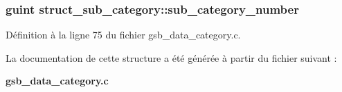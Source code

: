 \subsubsection[{sub\_\-category\_\-number}]{\setlength{\rightskip}{0pt plus 5cm}guint {\bf struct\_\-sub\_\-category::sub\_\-category\_\-number}}\label{structstruct__sub__category_aa3da3a08e68423679e0c255483dcfcf7}


Définition à la ligne 75 du fichier gsb\_\-data\_\-category.c.



La documentation de cette structure a été générée à partir du fichier suivant :\begin{DoxyCompactItemize}
\item 
{\bf gsb\_\-data\_\-category.c}\end{DoxyCompactItemize}
